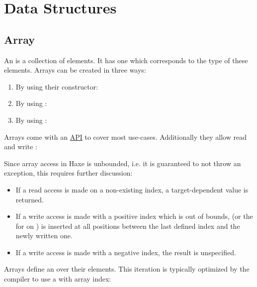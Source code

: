 \section{Data Structures}
\label{std-ds}

\subsection{Array}
\label{std-Array}

An  is a collection of elements. It has one  which corresponds to the type of these elements. Arrays can be created in three ways:

\begin{enumerate}
	\item By using their constructor: 
	\item By using : \expr{[1, 2, 3]}
	\item By using : \expr{[for (i in 0...10) if (i \% 2 == 0) i]}
\end{enumerate}

Arrays come with an \href{https://api.haxe.org/Array.html}{API} to cover most use-cases. Additionally they allow read and write :


Since array access in Haxe is unbounded, i.e. it is guaranteed to not throw an exception, this requires further discussion:

\begin{itemize}
	\item If a read access is made on a non-existing index, a target-dependent value is returned.
	\item If a write access is made with a positive index which is out of bounds,  (or the  for  on ) is inserted at all positions between the last defined index and the newly written one.
	\item If a write access is made with a negative index, the result is unspecified.
\end{itemize}

Arrays define an  over their elements. This iteration is typically optimized by the compiler to use a  with array index:

